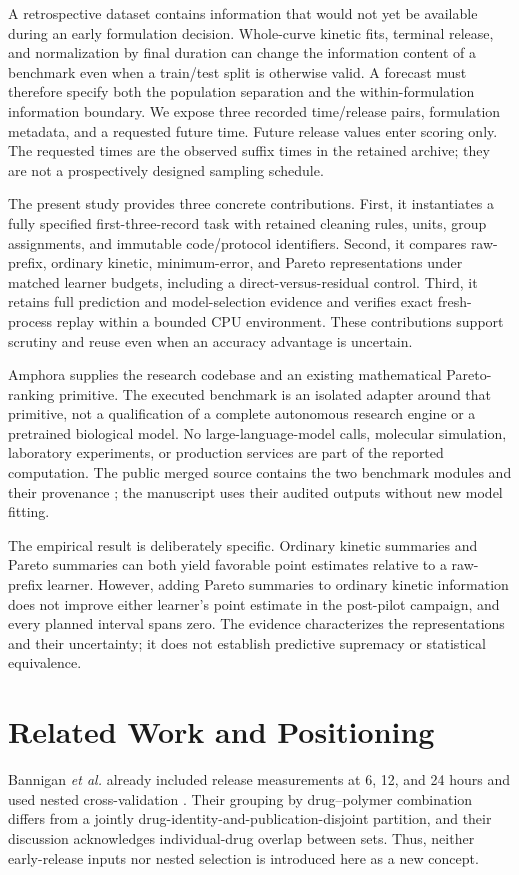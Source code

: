\documentclass[conference,letterpaper]{IEEEtran}
\begin{document}
A retrospective dataset contains information that would not yet be available during an early formulation decision. Whole-curve kinetic fits, terminal release, and normalization by final duration can change the information content of a benchmark even when a train/test split is otherwise valid. A forecast must therefore specify both the population separation and the within-formulation information boundary. We expose three recorded time/release pairs, formulation metadata, and a requested future time. Future release values enter scoring only. The requested times are the observed suffix times in the retained archive; they are not a prospectively designed sampling schedule.

The present study provides three concrete contributions. First, it instantiates a fully specified first-three-record task with retained cleaning rules, units, group assignments, and immutable code/protocol identifiers. Second, it compares raw-prefix, ordinary kinetic, minimum-error, and Pareto representations under matched learner budgets, including a direct-versus-residual control. Third, it retains full prediction and model-selection evidence and verifies exact fresh-process replay within a bounded CPU environment. These contributions support scrutiny and reuse even when an accuracy advantage is uncertain.

Amphora supplies the research codebase and an existing mathematical Pareto-ranking primitive. The executed benchmark is an isolated adapter around that primitive, not a qualification of a complete autonomous research engine or a pretrained biological model. No large-language-model calls, molecular simulation, laboratory experiments, or production services are part of the reported computation. The public merged source contains the two benchmark modules and their provenance \cite{amphora2026}; the manuscript uses their audited outputs without new model fitting.

The empirical result is deliberately specific. Ordinary kinetic summaries and Pareto summaries can both yield favorable point estimates relative to a raw-prefix learner. However, adding Pareto summaries to ordinary kinetic information does not improve either learner's point estimate in the post-pilot campaign, and every planned interval spans zero. The evidence characterizes the representations and their uncertainty; it does not establish predictive supremacy or statistical equivalence.

\section{Related Work and Positioning}
Bannigan \emph{et al.} already included release measurements at 6, 12, and 24 hours and used nested cross-validation \cite{bannigan2023}. Their grouping by drug--polymer combination differs from a jointly drug-identity-and-publication-disjoint partition, and their discussion acknowledges individual-drug overlap between sets. Thus, neither early-release inputs nor nested selection is introduced here as a new concept.
\end{document}

